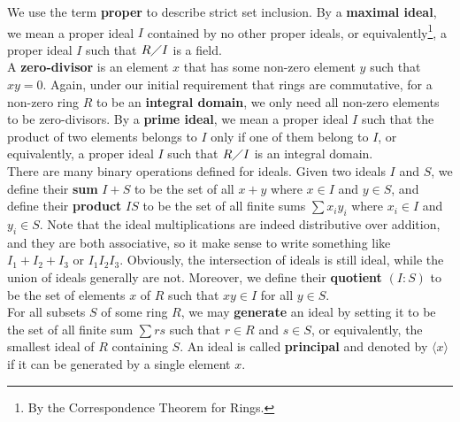 \documentclass{report}
\begin{document}
We use the term \textbf{proper} to describe strict set inclusion. By a \textbf{maximal ideal}, we mean a proper ideal $I$ contained by no other proper ideals, or equivalently\footnote{By the Correspondence Theorem for Rings.}, a proper ideal $I$ such that $R\diagup I$ is a field.\\

A \textbf{zero-divisor} is an element $x$ that has some non-zero element $y$ such that  $xy=0$. Again, under our initial requirement that rings are commutative, for a non-zero ring $R$ to be an  \textbf{integral domain}, we only need all non-zero elements to be zero-divisors. By a \textbf{prime ideal}, we mean a proper ideal $I$ such that the product of two elements belongs to $I$ only if one of them belong to $I$, or equivalently, a proper ideal $I$ such that $R\diagup I$ is an integral domain.  \\


There are many binary operations defined for ideals.  Given two ideals $I$ and $S$, we define their \textbf{sum} $I+S$ to be the set of all  $x+y$ where  $x\in I$ and $y \in S$, and define their \textbf{product} $IS$ to be the set of all finite sums $\sum x_iy_i$ where  $x_i \in I$ and $y_i\in S$. Note that the ideal multiplications are indeed distributive over addition, and they are both associative, so it make sense to write something like $I_1+I_2+I_3$ or $I_1I_2I_3$. Obviously, the intersection of ideals is still ideal, while the union of ideals generally are not. Moreover, we define their \textbf{quotient} $(I:S)$ to be the set of elements $x$ of $R$ such that $xy \in I$ for all $y \in S$. \\ 

For all subsets $S$ of some ring $R$, we may \textbf{generate} an ideal by setting it to be the set of all finite sum  $\sum rs$ such that $r\in R$ and $s \in S$, or equivalently, the smallest ideal of $R$ containing $S$. An ideal is called \textbf{principal} and denoted by $\langle x\rangle $ if it can be generated by a single element $x$. \\
\end{document}

